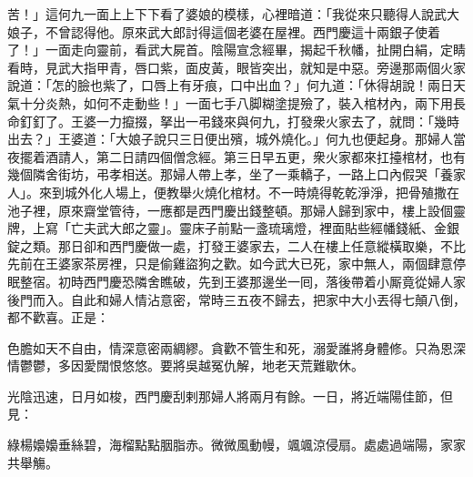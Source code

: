 苦！」這何九一面上上下下看了婆娘的模樣，心裡暗道：「我從來只聽得人說武大娘子，不曾認得他。原來武大郎討得這個老婆在屋裡。西門慶這十兩銀子使着了！」一面走向靈前，看武大屍首。陰陽宣念經畢，揭起千秋幡，扯開白絹，定睛看時，見武大指甲青，唇口紫，面皮黃，眼皆突出，就知是中惡。旁邊那兩個火家說道：「怎的臉也紫了，口唇上有牙痕，口中出血？」何九道：「休得胡說！兩日天氣十分炎熱，如何不走動些！」一面七手八脚糊塗提殮了，裝入棺材內，兩下用長命釘釘了。王婆一力攛掇，拏出一弔錢來與何九，打發衆火家去了，就問：「幾時出去？」王婆道：「大娘子說只三日便出殯，城外燒化。」何九也便起身。那婦人當夜擺着酒請人，第二日請四個僧念經。第三日早五更，衆火家都來扛擡棺材，也有幾個隣舍街坊，弔孝相送。那婦人帶上孝，坐了一乘轎子，一路上口內假哭「養家人」。來到城外化人場上，便教舉火燒化棺材。不一時燒得乾乾淨淨，把骨殖撒在池子裡，原來齋堂管待，一應都是西門慶出錢整頓。那婦人歸到家中，樓上設個靈牌，上寫「亡夫武大郎之靈」。{}靈床子前點一盞琉璃燈，裡面貼些經幡錢紙、金銀錠之類。那日卻和西門慶做一處，打發王婆家去，二人在樓上任意縱橫取樂，不比先前在王婆家茶房裡，只是偷雞盜狗之歡。如今武大已死，家中無人，兩個肆意停眠整宿。初時西門慶恐隣舍瞧破，先到王婆那邊坐一囘，落後帶着小厮竟從婦人家後門而入。自此和婦人情沾意密，常時三五夜不歸去，把家中大小丟得七顛八倒，都不歡喜。正是：

色膽如天不自由，情深意密兩綢繆。貪歡不管生和死，溺愛誰將身體修。只為恩深情鬱鬱，多因愛闊恨悠悠。要將吳越冤仇解，地老天荒難歇休。

光陰迅速，日月如梭，西門慶刮剌那婦人將兩月有餘。一日，將近端陽佳節，但見：

綠楊嬝嬝垂絲碧，海榴點點胭脂赤。微微風動幔，颯颯涼侵扇。處處過端陽，家家共舉觴。

